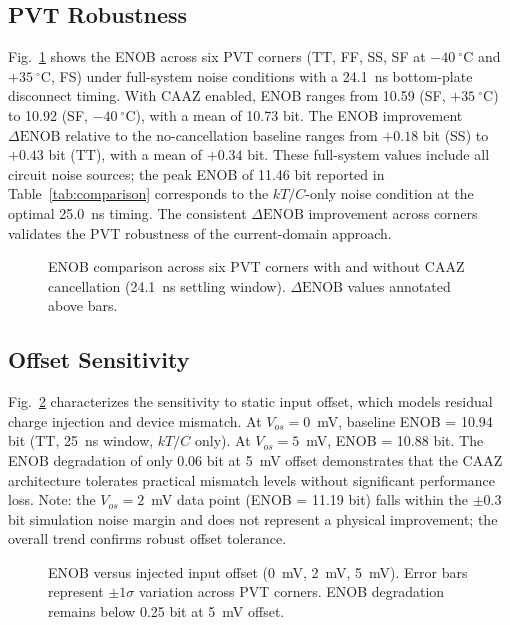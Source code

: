 \documentclass[journal]{IEEEtran}
\begin{document}
\subsection{PVT Robustness}

Fig.~\ref{fig:pvt} shows the ENOB across six PVT corners (TT, FF, SS, SF at $-40~^\circ$C and $+35~^\circ$C, FS) under full-system noise conditions with a 24.1~ns bottom-plate disconnect timing. With CAAZ enabled, ENOB ranges from 10.59 (SF, $+35~^\circ$C) to 10.92 (SF, $-40~^\circ$C), with a mean of 10.73 bit. The ENOB improvement $\Delta\text{ENOB}$ relative to the no-cancellation baseline ranges from $+0.18$ bit (SS) to $+0.43$ bit (TT), with a mean of $+0.34$ bit. These full-system values include all circuit noise sources; the peak ENOB of 11.46 bit reported in Table~\ref{tab:comparison} corresponds to the $kT/C$-only noise condition at the optimal 25.0~ns timing. The consistent $\Delta\text{ENOB}$ improvement across corners validates the PVT robustness of the current-domain approach.

\begin{figure}[!t]
\centering
{}
\caption{ENOB comparison across six PVT corners with and without CAAZ cancellation (24.1~ns settling window). $\Delta\text{ENOB}$ values annotated above bars.}
\label{fig:pvt}
\end{figure}

\subsection{Offset Sensitivity}

Fig.~\ref{fig:offset} characterizes the sensitivity to static input offset, which models residual charge injection and device mismatch. At $V_{os}=0$~mV, baseline ENOB = 10.94 bit (TT, 25~ns window, $kT/C$ only). At $V_{os}=5$~mV, ENOB = 10.88 bit. The ENOB degradation of only 0.06 bit at 5~mV offset demonstrates that the CAAZ architecture tolerates practical mismatch levels without significant performance loss. Note: the $V_{os}=2$~mV data point (ENOB = 11.19 bit) falls within the $\pm$0.3 bit simulation noise margin and does not represent a physical improvement; the overall trend confirms robust offset tolerance.

\begin{figure}[!t]
\centering
{}
\caption{ENOB versus injected input offset (0~mV, 2~mV, 5~mV). Error bars represent $\pm 1\sigma$ variation across PVT corners. ENOB degradation remains below 0.25 bit at 5~mV offset.}
\label{fig:offset}
\end{figure}
\end{document}
